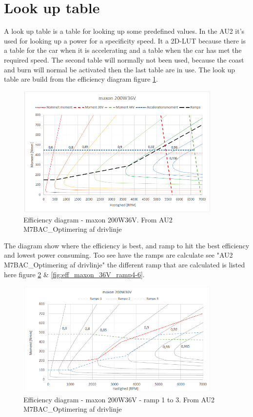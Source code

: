 \newpage
\section{Look up table}

A look up table is a table for looking up some predefined values. In the AU2 it's used for looking up a power for a specificity speed. It a 2D-LUT because there is a table for the car when it is accelerating and a table when the car has met the required speed. The second table will normally not been used, because the coast and burn will normal be activated then the last table are in use. The look up table are build from the efficiency diagram figure \ref{fig:eff_maxon_36V}. 

\begin{figure}[H]
	\centering
	\includegraphics [width=4in]{Software/Pictures/maxon-200W36V.PNG}
	\caption{Efficiency diagram - maxon 200W36V. From AU2 M7BAC\_Optimering af drivlinje}
	\label{fig:eff_maxon_36V}
\end{figure}

The diagram show where the efficiency is best, and ramp to hit the best efficiency and lowest power consuming. Too see have the ramps are calculate see "AU2 M7BAC\_Optimering af drivlinje"\cite{BAC_zenith33} the different ramp that are calculated is listed here figure \ref{fig:eff_maxon_36V_ramp1-3} \& \ref{fig:eff_maxon_36V_ramp4-6}.

\begin{figure}[H]
	\centering
	\includegraphics [width=4in]{Software/Pictures/Momentramper-1-3.PNG}
	\caption{Efficiency diagram - maxon 200W36V - ramp 1 to 3. From AU2 M7BAC\_Optimering af drivlinje}
	\label{fig:eff_maxon_36V_ramp1-3}
\end{figure}

